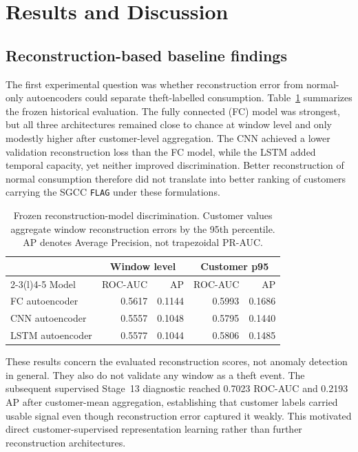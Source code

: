 \section{Results and Discussion}\label{sec:results-discussion}

\subsection{Reconstruction-based baseline findings}

The first experimental question was whether reconstruction error from normal-only autoencoders could separate theft-labelled consumption. Table~\ref{tab:reconstruction-results} summarizes the frozen historical evaluation. The fully connected (FC) model was strongest, but all three architectures remained close to chance at window level and only modestly higher after customer-level aggregation. The CNN achieved a lower validation reconstruction loss than the FC model, while the LSTM added temporal capacity, yet neither improved discrimination. Better reconstruction of normal consumption therefore did not translate into better ranking of customers carrying the SGCC \texttt{FLAG} under these formulations.

\begin{table}[t]
\caption{Frozen reconstruction-model discrimination. Customer values aggregate window reconstruction errors by the 95th percentile. AP denotes Average Precision, not trapezoidal PR-AUC.}
\label{tab:reconstruction-results}
\centering
\small
\begin{tabular}{@{}lrrrr@{}}
\toprule
& \multicolumn{2}{c}{Window level} & \multicolumn{2}{c}{Customer p95} \\
\cmidrule(lr){2-3}\cmidrule(l){4-5}
Model & ROC-AUC & AP & ROC-AUC & AP \\
\midrule
FC autoencoder   & 0.5617 & 0.1144 & 0.5993 & 0.1686 \\
CNN autoencoder  & 0.5557 & 0.1048 & 0.5795 & 0.1440 \\
LSTM autoencoder & 0.5577 & 0.1044 & 0.5806 & 0.1485 \\
\bottomrule
\end{tabular}
\end{table}

These results concern the evaluated reconstruction scores, not anomaly detection in general. They also do not validate any window as a theft event. The subsequent supervised Stage~13 diagnostic reached 0.7023 ROC-AUC and 0.2193 AP after customer-mean aggregation, establishing that customer labels carried usable signal even though reconstruction error captured it weakly. This motivated direct customer-supervised representation learning rather than further reconstruction architectures.

